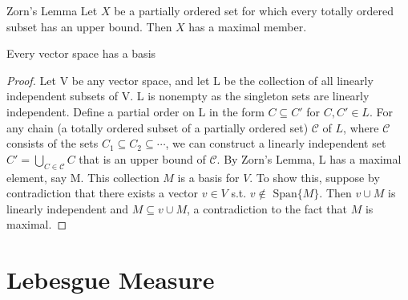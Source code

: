 \documentclass[a4paper,10pt]{book}
\theoremstyle{plain} %
\newcommand{\thistheoremname}{}
\newtheorem*{genericthm*}{\thistheoremname}
\newenvironment{namedthm*}[1]
	{\renewcommand{\thistheoremname}{#1}%
	\begin{genericthm*}}
	{\end{genericthm*}}
\begin{document}
\begin{flushleft}
\begin{namedthm*}{Zorn's Lemma}
	Let $X$ be a partially ordered set for which every totally ordered subset has an upper bound. Then $X$ has a maximal member.
\end{namedthm*}

\begin{namedthm*}{Every vector space has a basis}
\end{namedthm*}
\begin{proof}
Let V be any vector space, and let L be the collection of all linearly independent subsets of V. 
L is nonempty as the singleton sets are linearly independent. 
Define a partial order on L in the form $C \subseteq C'$ for $C,C' \in L$.
For any chain (a totally ordered subset of a partially ordered set) $\mathcal{C}$ of $L$, where $\mathcal{C}$ consists of the sets $C_1 \subseteq C_2 \subseteq \cdots$, we can construct a linearly independent set $C' = \bigcup_{C \in \mathcal{C}} C$ that is an upper bound of $\mathcal{C}$.
By Zorn's Lemma, L has a maximal element, say M.
This collection $M$ is a basis for $V$. To show this, suppose by contradiction that there exists a vector $v \in V$ s.t. $v \notin \text{ Span}\{M\}$.
Then $v \cup M$ is linearly independent and $M \subseteq v \cup M$, a contradiction to the fact that $M$ is maximal.
\end{proof}

\end{flushleft}



\chapter{Lebesgue Measure}
\end{document}
